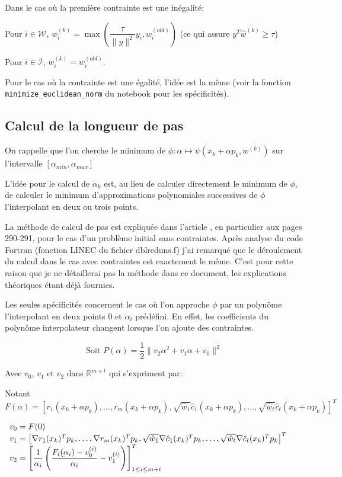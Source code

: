 \documentclass[a4paper,11pt]{article}
\newcommand{\hc}{\hat{c}}
\numberwithin{equation}{section}
\begin{document}
 
Dans le cas où la première contrainte est une inégalité: 

Pour $i \in \mathcal{W}$, $w_{i}^{(k)} = \max(\dfrac{\tau}{\|y\|^{2}}y_{i}, w_{i}^{(old)})$ (ce qui assure $y^{T}\hat{w}^{(k)} \geq \tau$)

Pour $i \in \mathcal{I}$, $w_{i}^{(k)} = w_{i}^{(old)}$.


Pour le cas où la contrainte est une égalité, l'idée est la même (voir la fonction \texttt{minimize\_euclidean\_norm} du notebook pour les spécificités).

\subsection{Calcul de la longueur de pas}

On rappelle que l'on cherche le minimum de $\phi: \alpha \mapsto \psi(x_{k}+\alpha p_{k},w^{(k)})$ sur l'intervalle $[\alpha_{min},\alpha_{max}]$

L'idée pour le calcul de $\alpha_{k}$ est, au lieu de calculer directement le minimum de $\phi$, de calculer le minimum d'approximations polynomiales successives de $\phi$ l'interpolant en deux ou trois points. 

La méthode de calcul de pas est expliquée dans l'article \cite{lindstromwedin1984}, en particulier aux pages 290-291, pour le cas d'un problème initial sans contraintes. Après analyse du code Fortran (fonction LINEC du fichier dblreduns.f) j'ai remarqué que le déroulement du calcul dans le cas avec contraintes est exactement le même. C'est pour cette raison que je ne détaillerai pas la méthode dans ce document, les explications théoriques étant déjà fournies.


Les seules spécificités concernent le cas où l'on approche $\phi$ par un polynôme l'interpolant en deux points $0$ et $\alpha_{i}$ prédéfini. En effet, les coefficients du polynôme interpolateur changent lorsque l'on ajoute des contraintes.

$$\text{Soit }P(\alpha) = \dfrac{1}{2}\|v_2\alpha^2 + v_1\alpha + v_0\|^2$$

Avec $v_0$, $v_1$ et $v_2$ dans $\mathbb{R}^{m+t}$ qui s'expriment par: 

Notant $F(\alpha) = \left[r_1(x_{k}+\alpha p_{k}), \ldots, r_m(x_{k}+\alpha p_{k}), \sqrt{\hat{w}_1}\hc_1(x_{k}+\alpha p_{k}), \ldots, \sqrt{\hat{w}_t}\hc_t(x_{k}+\alpha p_{k})\right]^{T}$

$\begin{array}{l l l}
v_0 = F(0) \\
v_1 = \left[\nabla r_1(x_{k})^Tp_{k},\ldots, \nabla r_m(x_{k})^Tp_{k}, \sqrt{\hat{w}_1}\nabla \hc_1(x_{k})^Tp_{k}, \ldots, \sqrt{\hat{w}_t}\nabla \hc_t(x_{k})^Tp_{k} \right]^T \\
v_2 = \left[ \dfrac{1}{\alpha_i}\left( \dfrac{F_i(\alpha_i) - v_0^{(i)}}{\alpha_i} - v_1^{(i)}\right)\right]_{1 \leq i \leq m+t}^T
\end{array}$
\end{document}

